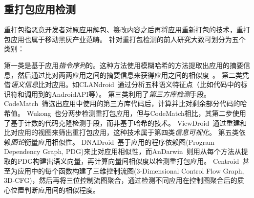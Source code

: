 \subsection{重打包应用检测}
\label{sec:repackaging}
重打包指恶意开发者对原应用解包、篡改内容之后再将应用重新打包的技术，重打包应用也属于移动黑灰产业范畴。
针对重打包检测的前人研究大致可划分为五个类别：

第一类是基于应用\textit{指令序列}的。这种方法使用模糊哈希的方法提取出应用的摘要信息，然后通过比对两两应用之间的摘要信息来获得应用之间的相似度~\cite{DroidMOSS, Zheng2013DroidAnalyticsA}。
第二类凭借\textit{语义信息}比对应用。如CLANdroid~\cite{CLANdroid}通过分析五种语义特征点（比如代码中的标识符和调用到的AndroidAPI等）。
第三类利用了\textit{第三方库检测}手段。CodeMatch~\cite{CodeMatch}筛选出应用中使用的第三方库代码后，计算并比对剩余部分代码的哈希值。
Wukong~\cite{Wukong}也分两步检测重打包应用，但与CodeMatch相比，其第二步使用了基于计数的代码克隆检测手段，而非基于哈希的技术。
ViewDroid~\cite{ViewDroid}通过重建和比对应用的视图来筛出重打包应用，这种技术属于第四类\textit{信息可视化}。
第五类依赖\textit{图论}衡量应用相似性。
DNADroid~\cite{DNADroid}基于应用的程序依赖图(Program Dependency Graph, PDG)来比对应用相似性，而AnDarwin~\cite{AnDarwin}则用从每个方法从提取的PDG构建出语义向量，再计算向量间相似度以检测重打包应用。
Centroid~\cite{Centroid}甚至为应用中的每个函数构建了三维控制流图(3-Dimensional Control Flow Graph, 3D-CFG)，然后再将三位控制流图聚合，通过检测不同应用在控制图聚合后的质心位置判断应用间的相似程度。

